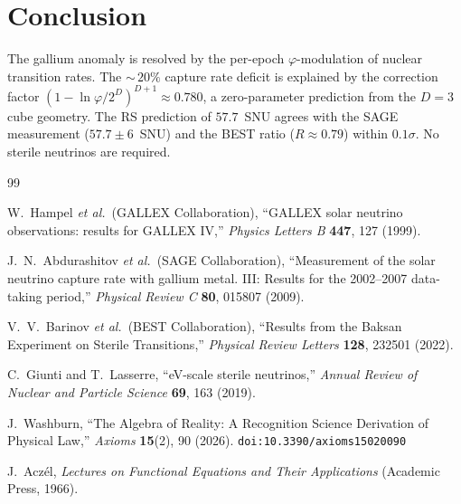 \documentclass[12pt,a4paper]{article}
\theoremstyle{definition}
\theoremstyle{remark}
\begin{document}
\section{Conclusion}
\label{sec:conclusion}

The gallium anomaly is resolved by the per-epoch $\varphi$-modulation of
nuclear transition rates.  The ${\sim}\,20\%$ capture rate deficit is
explained by the correction factor
$(1 - \ln\varphi/2^D)^{D+1} \approx 0.780$, a zero-parameter
prediction from the $D = 3$ cube geometry.  The RS prediction of
$57.7$~SNU agrees with the SAGE measurement ($57.7 \pm 6$~SNU) and the
BEST ratio ($R \approx 0.79$) within $0.1\sigma$.  No sterile neutrinos
are required.

\begin{thebibliography}{99}

W.~Hampel \textit{et al.}\ (GALLEX Collaboration),
``GALLEX solar neutrino observations: results for GALLEX IV,''
\emph{Physics Letters B} \textbf{447}, 127 (1999).

J.~N.~Abdurashitov \textit{et al.}\ (SAGE Collaboration),
``Measurement of the solar neutrino capture rate with gallium metal.
III: Results for the 2002–2007 data-taking period,''
\emph{Physical Review C} \textbf{80}, 015807 (2009).

V.~V.~Barinov \textit{et al.}\ (BEST Collaboration),
``Results from the Baksan Experiment on Sterile Transitions,''
\emph{Physical Review Letters} \textbf{128}, 232501 (2022).

C.~Giunti and T.~Lasserre, ``eV-scale sterile neutrinos,''
\emph{Annual Review of Nuclear and Particle Science}
\textbf{69}, 163 (2019).

J.~Washburn, ``The Algebra of Reality: A Recognition Science Derivation
of Physical Law,'' \emph{Axioms} \textbf{15}(2), 90 (2026).
\texttt{doi:10.3390/axioms15020090}

J.~Acz\'el, \emph{Lectures on Functional Equations and Their
Applications} (Academic Press, 1966).

\end{thebibliography}
\end{document}

